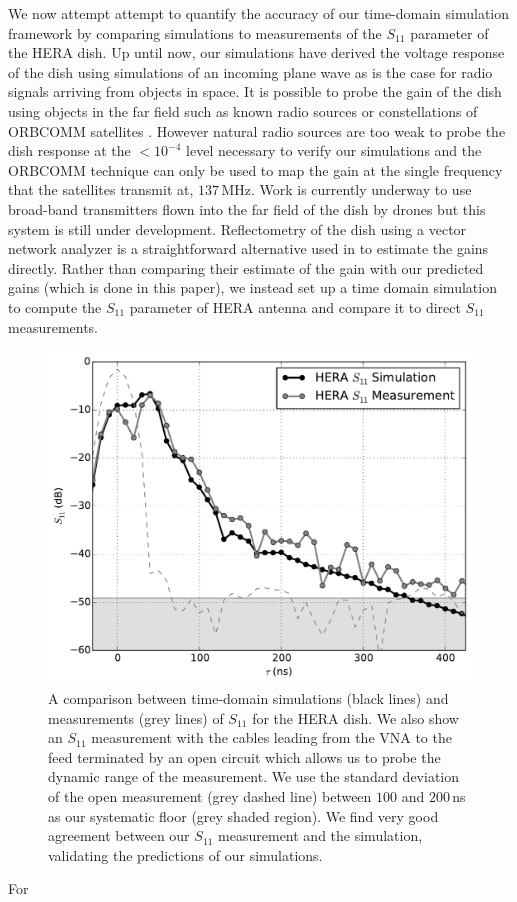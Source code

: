 \documentclass[twocolumn]{emulateapj}
\begin{document}
We now attempt attempt to quantify the accuracy of our time-domain simulation framework by comparing simulations to measurements of the $S_{11}$ parameter of the HERA dish. Up until now, our simulations have derived the voltage response of the dish using simulations of an incoming plane wave as is the case for radio signals arriving from objects in space. It is possible to probe the gain of the dish using objects in the far field such as known radio sources \citep{Thyagarajan:2011,Pober:2012,Colgate:2015} or constellations of ORBCOMM satellites \citep{Neben:2015,Neben:2016}. However natural radio sources are too weak to probe the dish response at the $<10^{-4}$ level necessary to verify our simulations and the ORBCOMM technique can only be used to map the gain at the single frequency that the satellites transmit at, $137$\,MHz. Work is currently underway to use broad-band transmitters flown into the far field of the dish by drones \citep{Jacobs:2016} but this system is still under development. Reflectometry of the dish using a vector network analyzer is a straightforward alternative used in \citet{Patra:2016} to estimate the gains directly. Rather than comparing their estimate of the gain with our predicted gains (which is done in this paper), we instead set up a time domain simulation to compute the $S_{11}$ parameter of HERA antenna and compare it to direct $S_{11}$ measurements.
\begin{figure}
\includegraphics[width=.5\textwidth]{figures/s11_compare.pdf}
\caption{A comparison between time-domain simulations (black lines) and measurements (grey lines) of $S_{11}$ for the HERA dish. We also show an $S_{11}$ measurement with the cables leading from the VNA to the feed terminated by an open circuit which allows us to probe the dynamic range of the measurement. We use the standard deviation of the open measurement (grey dashed line) between $100$ and $200$\,ns as our systematic floor (grey shaded region). We find very good agreement between our $S_{11}$ measurement and the simulation, validating the predictions of our simulations.}
\label{fig:S11}
\end{figure}
For 
\end{document}

